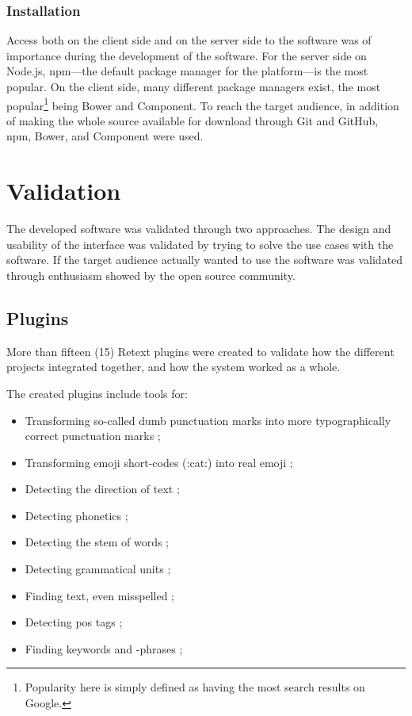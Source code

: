 \subsection{Installation}\label{installation}

Access both on the client side and on the server side to the software
was of importance during the development of the software. For the server
side on Node.js, \gls{npm}---the default package manager for the platform---is
the most popular. On the client side, many different package managers
exist, the most popular\footnote{Popularity here is simply defined as
  having the most search results on Google.} being Bower and Component.
To reach the target audience, in addition of making the whole source
available for download through Git and GitHub, \gls{npm}, Bower, and Component
were used.

\chapter{Validation}\label{validation}

The developed software was validated through two approaches. The design
and usability of the interface was validated by trying to solve the use
cases with the software. If the target audience actually wanted to use
the software was validated through enthusiasm showed by the open source
community.

\section{Plugins}\label{plugins}

More than fifteen (15) Retext plugins were created to validate how the
different projects integrated together, and how the system worked as a
whole.

The created plugins include tools for:

\begin{itemize}
\itemsep1pt\parskip0pt
\item
  Transforming so-called dumb punctuation marks into more
  typographically correct punctuation marks
  \autocite*{wooorm/retext-smartypants-source-code};
\item
  Transforming emoji short-codes (:cat:) into real emoji
  \autocite*{wooorm/retext-emoji-source-code};
\item
  Detecting the direction of text
  \autocite*{wooorm/retext-directionality-source-code};
\item
  Detecting phonetics
  \autocite*{wooorm/retext-double-metaphone-source-code};
\item
  Detecting the stem of words
  \autocite*{wooorm/retext-porter-stemmer-source-code};
\item
  Detecting grammatical units
  \autocite*{wooorm/retext-visit-source-code};
\item
  Finding text, even misspelled
  \autocite*{wooorm/retext-search-source-code};
\item
  Detecting \gls{pos} tags
  \autocite*{wooorm/retext-pos-source-code};
\item
  Finding keywords and -phrases
  \autocite*{wooorm/retext-keywords-source-code};
\end{itemize}

